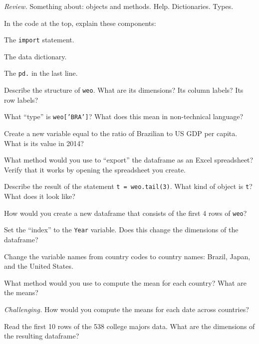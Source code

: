 \documentclass[11pt]{exam}
\begin{document}
\begin{questions}
\item {\it Review.\/}  Something about:  objects and methods.  Help.  Dictionaries.  Types.

\item In the code at the top, explain these components:
\begin{parts}
\item The \texttt{import} statement.
\item The data dictionary.
\item The \texttt{pd.} in the last line.
\end{parts}

\item Describe the structure of \texttt{weo}.  What are its dimensions?
Its column labels? Its row labels?

\item What ``type'' is \texttt{weo['BRA']}?
What does this mean in non-technical language?

\item Create a new variable equal to the ratio of Brazilian to US GDP per capita.
What is its value in 2014?

\item What method would you use to ``export'' the dataframe as an Excel spreadsheet?
Verify that it works by opening the spreadsheet you create.

\item Describe the result of the statement \texttt{t = weo.tail(3)}.
What kind of object is \texttt{t}?  What does it look like?

\item How would you create a new dataframe that consists of the first 4 rows of \texttt{weo}?

\item Set the ``index'' to the \texttt{Year} variable.
Does this change the dimensions of the dataframe?

\item Change the variable names from country codes to country names:
Brazil, Japan, and the United States.

\item What method would you use to compute the mean for each country?
What are the means?

\item {\it Challenging.\/}
How would you compute the means for each date across countries?

\item Read the first 10 rows of the 538 college majors data.
What are the dimensions of the resulting dataframe?


\end{questions}
\end{document}
